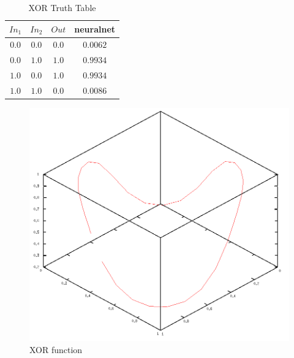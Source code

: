 \documentclass{article}
\begin{document}
\begin{table}[ht]
	\caption{XOR Truth Table}
	\label{tab:xortable}
	\begin{center}
		\begin{tabular}{cc|cc}
		\hline
		\hline
		\textbf{$In_1$} & \textbf{$In_2$} & \textbf{$Out$} & neuralnet \\
		\hline
			$0.0$ & $0.0$ & $0.0$ & $0.0062$\\
			$0.0$ & $1.0$ & $1.0$ & $0.9934$\\
			$1.0$ & $0.0$ & $1.0$ & $0.9934$\\
			$1.0$ & $1.0$ & $0.0$ & $0.0086$\\
		\hline

		\hline
		\end{tabular}
	\end{center}
\end{table}

\begin{figure}[tb]
	\begin{center}
		\includegraphics[scale=0.5]{img/xor1}
	\end{center}
	\caption{XOR function}
	\label{fig:xor1}
\end{figure}
\end{document}
